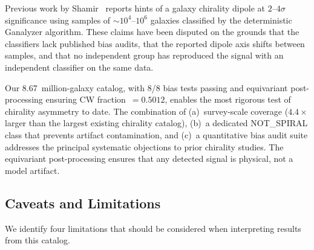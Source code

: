 Previous work by Shamir~\citep{Shamir:2012,Shamir:2020,Shamir:2022}
reports hints of a galaxy chirality dipole at $2$--$4\sigma$
significance using samples of $\sim\!10^4$--$10^6$ galaxies classified
by the deterministic Ganalyzer algorithm.  These claims have been
disputed on the grounds that the classifiers lack published bias audits,
that the reported dipole axis shifts between samples, and that no
independent group has reproduced the signal with an independent
classifier on the same data.

Our 8.67~million-galaxy catalog, with 8/8 bias tests passing and
equivariant post-processing ensuring CW fraction~$= 0.5012$, enables
the most rigorous test of chirality asymmetry to date.  The combination
of (a)~survey-scale coverage ($4.4\times$ larger than the largest
existing chirality catalog), (b)~a dedicated NOT\_SPIRAL class that
prevents artifact contamination, and (c)~a quantitative bias audit
suite addresses the principal systematic objections to prior chirality
studies.  The equivariant post-processing ensures that any detected
signal is physical, not a model artifact.

\subsection{Caveats and Limitations}
\label{sec:chirality_caveats}

We identify four limitations that should be considered when interpreting
results from this catalog.

